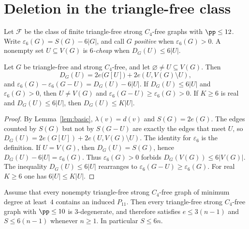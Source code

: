 %

\section{Deletion in the triangle-free class}\label{app:delete}

Let $\mathcal F$ be the class of finite triangle-free strong $C_4$-free graphs with $\pp\le 12$. Write $\varepsilon_6(G)=S(G)-6|G|$, and call $G$ \emph{positive} when $\varepsilon_6(G)>0$. A nonempty set $U\subseteq V(G)$ is \emph{$6$-cheap} when $D_G(U)\le 6|U|$.

\begin{lemma}\label{lem:tfmargin}
Let $G$ be triangle-free and strong $C_4$-free, and let $\varnothing\ne U\subseteq V(G)$. Then
\[
D_G(U)=2e\bigl(G[U]\bigr)+2e(U,V(G)\setminus U),
\]
and $\varepsilon_6(G)-\varepsilon_6(G-U)=D_G(U)-6|U|$. If $D_G(U)\le 6|U|$ and $\varepsilon_6(G)>0$, then $U\ne V(G)$ and $\varepsilon_6(G-U)\ge\varepsilon_6(G)>0$. If $K\ge 6$ is real and $D_G(U)\le 6|U|$, then $D_G(U)\le K|U|$.
\end{lemma}

\begin{proof}
By Lemma~\ref{lem:basic}, $\lambda(v)=d(v)$ and $S(G)=2e(G)$. The edges counted by $S(G)$ but not by $S(G-U)$ are exactly the edges that meet $U$, so $D_G(U)=2e(G[U])+2e(U,V(G)\setminus U)$. The identity for $\varepsilon_6$ is the definition. If $U=V(G)$, then $D_G(U)=S(G)$, hence $D_G(U)-6|U|=\varepsilon_6(G)$. Thus $\varepsilon_6(G)>0$ forbids $D_G(V(G))\le 6|V(G)|$. The inequality $D_G(U)\le 6|U|$ rearranges to $\varepsilon_6(G-U)\ge\varepsilon_6(G)$. For real $K\ge 6$ one has $6|U|\le K|U|$.
\end{proof}

\begin{lemma}\label{lem:degenerate}
Assume that every nonempty triangle-free strong $C_4$-free graph of minimum degree at least~$4$ contains an induced $P_{11}$. Then every triangle-free strong $C_4$-free graph with $\pp\le 10$ is $3$-degenerate, and therefore satisfies $e\le 3(n-1)$ and $S\le 6(n-1)$ whenever $n\ge 1$. In particular $S\le 6n$.
\end{lemma}

